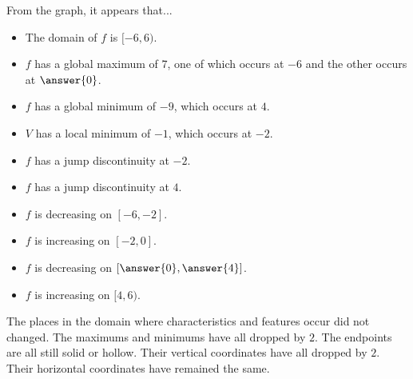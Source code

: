 \documentclass{ximera}
\begin{document}
\begin{example}
\begin{image}
\end{image}





From the graph, it appears that... 

\begin{itemize}

\item The domain of $f$ is $[-6,6)$.
\item $f$ has a global maximum of $7$, one of which occurs at $-6$ and the other occurs at $\answer{0}$.
\item $f$ has a global minimum of $-9$, which occurs at $4$.
\item $V$ has a local minimum of $-1$, which occurs at $-2$.
\item $f$ has a jump discontinuity at $-2$.
\item $f$ has a jump discontinuity at $4$.
\item $f$ is decreasing on $[-6, -2]$.
\item $f$ is increasing on $[-2, 0]$.
\item $f$ is decreasing on $\left[\answer{0}, \answer{4}\right]$.
\item $f$ is increasing on $[4, 6)$.


\end{itemize}



The places in the domain where characteristics and features occur did not changed.  The maximums and minimums have all dropped by $2$.  The endpoints are all still solid or hollow.  Their vertical coordinates have all dropped by $2$. Their horizontal coordinates have remained the same.






\end{example}
\end{document}

